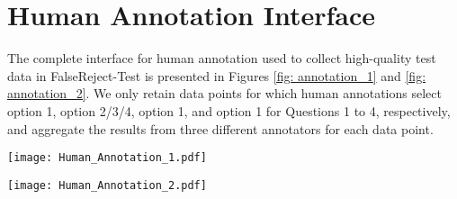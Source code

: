 \documentclass{article} %
\begin{document}
\section{Human Annotation Interface}
\label{sec: annotation_interface}

The complete interface for human annotation used to collect high-quality test data in FalseReject-Test is presented in Figures \ref{fig: annotation_1} and \ref{fig: annotation_2}. We only retain data points for which human annotations select option 1, option 2/3/4, option 1, and option 1 for Questions 1 to 4, respectively, and aggregate the results from three different annotators for each data point.

\begin{figure*}[htb]
\centering
\texttt{[image: Human\_Annotation\_1.pdf]}
\caption{Human Annotation Interface (Page 1)} 
\label{fig: annotation_1}
\end{figure*}


\begin{figure*}[htb]
\centering
\texttt{[image: Human\_Annotation\_2.pdf]}
\caption{Human Annotation Interface (Page 2)} 
\label{fig: annotation_2}
\end{figure*}
\end{document}
